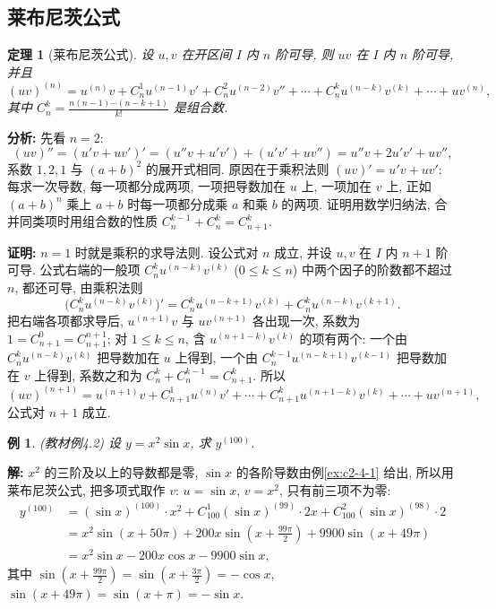 \documentclass[UTF8,openany]{ctexbook}
\theoremstyle{chinesetextbook}
\newtheorem{example}{例}[section]
\newenvironment{cnproof}{\par\indent\textbf{证明:} \ignorespaces}{\par}
\newenvironment{cnsolution}{\par\indent\textbf{解:} \ignorespaces}{\par}
\newtheorem*{theoremsingle}{定理}
\begin{document}
\subsection{莱布尼茨公式}
\begin{theoremsingle}[莱布尼茨公式]
设 $u,v$ 在开区间 $I$ 内 $n$ 阶可导, 则 $uv$ 在 $I$ 内 $n$ 阶可导, 并且
\[
(uv)^{(n)}=u^{(n)}v+C_n^1u^{(n-1)}v'+C_n^2u^{(n-2)}v''+\cdots+C_n^ku^{(n-k)}v^{(k)}+\cdots+uv^{(n)},
\]
其中 $\displaystyle C_n^k=\frac{n(n-1)\cdots(n-k+1)}{k!}$ 是组合数.
\end{theoremsingle}
\par\indent\textbf{分析:} 先看 $n=2$:
\[
(uv)''=(u'v+uv')'=(u''v+u'v')+(u'v'+uv'')=u''v+2u'v'+uv'',
\]
系数 $1,2,1$ 与 $(a+b)^2$ 的展开式相同. 原因在于乘积法则 $(uv)'=u'v+uv'$: 每求一次导数, 每一项都分成两项, 一项把导数加在 $u$ 上, 一项加在 $v$ 上, 正如 $(a+b)^n$ 乘上 $a+b$ 时每一项都分成乘 $a$ 和乘 $b$ 的两项. 证明用数学归纳法, 合并同类项时用组合数的性质 $C_n^{k-1}+C_n^k=C_{n+1}^k$.
\begin{cnproof}
$n=1$ 时就是乘积的求导法则. 设公式对 $n$ 成立, 并设 $u,v$ 在 $I$ 内 $n+1$ 阶可导. 公式右端的一般项 $C_n^ku^{(n-k)}v^{(k)}$ ($0\le k\le n$) 中两个因子的阶数都不超过 $n$, 都还可导, 由乘积法则
\[
\bigl(C_n^ku^{(n-k)}v^{(k)}\bigr)'=C_n^ku^{(n-k+1)}v^{(k)}+C_n^ku^{(n-k)}v^{(k+1)}.
\]
把右端各项都求导后, $u^{(n+1)}v$ 与 $uv^{(n+1)}$ 各出现一次, 系数为 $1=C_{n+1}^0=C_{n+1}^{n+1}$; 对 $1\le k\le n$, 含 $u^{(n+1-k)}v^{(k)}$ 的项有两个: 一个由 $C_n^ku^{(n-k)}v^{(k)}$ 把导数加在 $u$ 上得到, 一个由 $C_n^{k-1}u^{(n-k+1)}v^{(k-1)}$ 把导数加在 $v$ 上得到, 系数之和为 $C_n^k+C_n^{k-1}=C_{n+1}^k$. 所以
\[
(uv)^{(n+1)}=u^{(n+1)}v+C_{n+1}^1u^{(n)}v'+\cdots+C_{n+1}^ku^{(n+1-k)}v^{(k)}+\cdots+uv^{(n+1)},
\]
公式对 $n+1$ 成立.
\end{cnproof}
\begin{example}\label{ex:c2-4-2}
\textnormal{(教材例4.2)} 设 $y=x^2\sin x$, 求 $y^{(100)}$.
\end{example}
\begin{cnsolution}
$x^2$ 的三阶及以上的导数都是零, $\sin x$ 的各阶导数由例\ref{ex:c2-4-1} 给出, 所以用莱布尼茨公式, 把多项式取作 $v$: $u=\sin x$, $v=x^2$, 只有前三项不为零:
\[
\begin{aligned}
y^{(100)}&=(\sin x)^{(100)}\cdot x^2+C_{100}^1(\sin x)^{(99)}\cdot2x+C_{100}^2(\sin x)^{(98)}\cdot2\\
&=x^2\sin(x+50\pi)+200x\sin\left(x+\frac{99\pi}2\right)+9900\sin(x+49\pi)\\
&=x^2\sin x-200x\cos x-9900\sin x,
\end{aligned}
\]
其中 $\displaystyle\sin\left(x+\frac{99\pi}2\right)=\sin\left(x+\frac{3\pi}2\right)=-\cos x$, $\sin(x+49\pi)=\sin(x+\pi)=-\sin x$.
\end{cnsolution}
\end{document}
